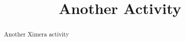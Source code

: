 \documentclass{ximera}
\title{Another Activity}
\begin{document}
\begin{abstract}
Another Ximera activity
\end{abstract}
\maketitle
\end{document}
